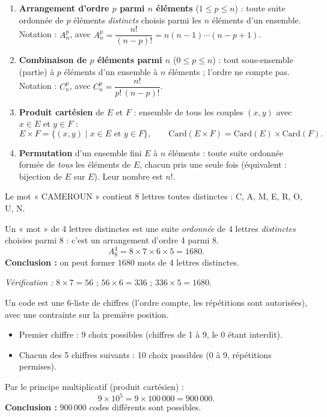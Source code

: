 \documentclass[11pt]{article}
\newcommand{\cle}[1]{{\popxbold\color{popdark}#1}}
\begin{document}
\begin{corrige}
\begin{enumerate}
    \item \textbf{Arrangement d'ordre $p$ parmi $n$ éléments} ($1 \le p \le n$) : toute suite ordonnée de $p$ éléments \emph{distincts} choisis parmi les $n$ éléments d'un ensemble. Notation : $A_n^p$, avec $A_n^p = \dfrac{n!}{(n-p)!} = n(n-1)\cdots(n-p+1)$.
    \item \textbf{Combinaison de $p$ éléments parmi $n$} ($0 \le p \le n$) : tout sous-ensemble (partie) à $p$ éléments d'un ensemble à $n$ éléments ; l'ordre ne compte pas. Notation : $C_n^p$, avec $C_n^p = \dfrac{n!}{p!\,(n-p)!}$.
    \item \textbf{Produit cartésien} de $E$ et $F$ : ensemble de tous les couples $(x,y)$ avec $x \in E$ et $y \in F$ :
    \[ E \times F = \{(x,y) \mid x \in E \text{ et } y \in F\}, \qquad \text{Card}(E \times F) = \text{Card}(E) \times \text{Card}(F). \]
    \item \textbf{Permutation} d'un ensemble fini $E$ à $n$ éléments : toute suite ordonnée formée de \emph{tous} les éléments de $E$, chacun pris une seule fois (équivalent : bijection de $E$ sur $E$). Leur nombre est $n!$.
\end{enumerate}
\end{corrige}

\begin{corrige}
Le mot « CAMEROUN » contient 8 lettres toutes distinctes : C, A, M, E, R, O, U, N.

Un « mot » de 4 lettres distinctes est une suite \emph{ordonnée} de 4 lettres \emph{distinctes} choisies parmi 8 : c'est un \cle{arrangement} d'ordre 4 parmi 8.
\[ A_8^4 = 8 \times 7 \times 6 \times 5 = 1680. \]
\textbf{Conclusion :} on peut former $1680$ mots de 4 lettres distinctes.

\emph{Vérification :} $8 \times 7 = 56$ ; $56 \times 6 = 336$ ; $336 \times 5 = 1680$.
\end{corrige}

\begin{corrige}
Un code est une 6-liste de chiffres (l'ordre compte, les répétitions sont autorisées), avec une contrainte sur la première position.

\begin{itemize}
    \item Premier chiffre : 9 choix possibles (chiffres de 1 à 9, le 0 étant interdit).
    \item Chacun des 5 chiffres suivants : 10 choix possibles (0 à 9, répétitions permises).
\end{itemize}

Par le principe multiplicatif (produit cartésien) :
\[ 9 \times 10^5 = 9 \times 100\,000 = 900\,000. \]
\textbf{Conclusion :} $900\,000$ codes différents sont possibles.
\end{corrige}
\end{document}
